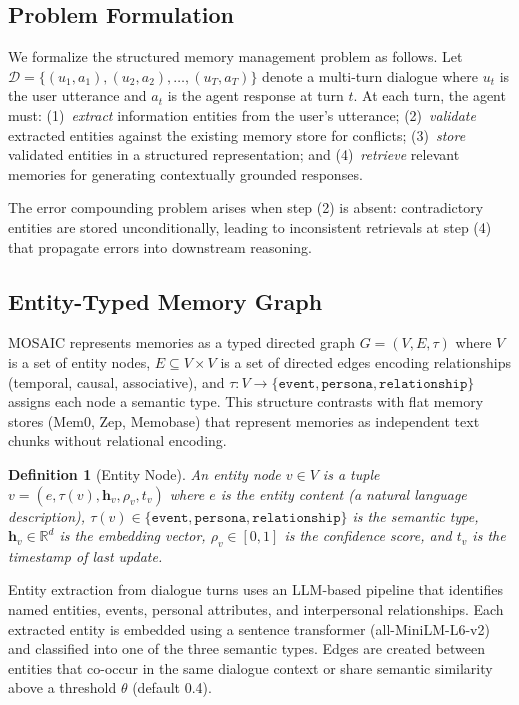 \documentclass[10pt,twocolumn]{article}
\newtheorem{definition}{Definition}
\begin{document}
\subsection{Problem Formulation}
\label{sec:problem}

We formalize the structured memory management problem as follows. Let
$\mathcal{D} = \{(u_1, a_1), (u_2, a_2), \ldots, (u_T, a_T)\}$ denote a
multi-turn dialogue where $u_t$ is the user utterance and $a_t$ is the
agent response at turn $t$. At each turn, the agent must:
(1)~\emph{extract} information entities from the user's utterance;
(2)~\emph{validate} extracted entities against the existing memory store for
conflicts; (3)~\emph{store} validated entities in a structured
representation; and (4)~\emph{retrieve} relevant memories for generating
contextually grounded responses.

The error compounding problem arises when step (2) is absent: contradictory
entities are stored unconditionally, leading to inconsistent retrievals at
step (4) that propagate errors into downstream reasoning.

\subsection{Entity-Typed Memory Graph}
\label{sec:entity_graph}

MOSAIC represents memories as a typed directed graph $G = (V, E, \tau)$
where $V$ is a set of entity nodes, $E \subseteq V \times V$ is a set of
directed edges encoding relationships (temporal, causal, associative), and
$\tau: V \to \{\texttt{event}, \texttt{persona}, \texttt{relationship}\}$
assigns each node a semantic type. This structure contrasts with flat memory
stores (Mem0, Zep, Memobase) that represent memories as independent text
chunks without relational encoding.

\begin{definition}[Entity Node]
\label{def:entity}
An entity node $v \in V$ is a tuple $v = (e, \tau(v), \mathbf{h}_v,
\rho_v, t_v)$ where $e$ is the entity content (a natural language
description), $\tau(v) \in \{\texttt{event}, \texttt{persona},
\texttt{relationship}\}$ is the semantic type, $\mathbf{h}_v \in
\mathbb{R}^d$ is the embedding vector, $\rho_v \in [0,1]$ is the
confidence score, and $t_v$ is the timestamp of last update.
\end{definition}

Entity extraction from dialogue turns uses an LLM-based pipeline that
identifies named entities, events, personal attributes, and interpersonal
relationships. Each extracted entity is embedded using a sentence
transformer (all-MiniLM-L6-v2)~\citep{reimers2019sentence} and classified
into one of the three semantic types. Edges are created between entities
that co-occur in the same dialogue context or share semantic similarity
above a threshold $\theta$ (default 0.4).
\end{document}

